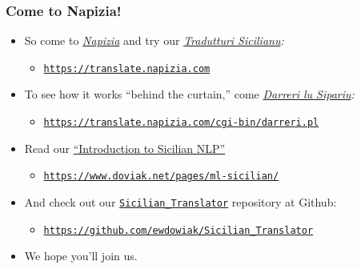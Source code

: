 \documentclass{beamer}
\begin{document}

\begin{frame}
  \frametitle{Come to Napizia!}
  \vspace{-1.0em}
  \begin{itemize}
  \item So come to \href{https://www.napizia.com/index.shtml}{\textit{Napizia}} and try our
    \href{https://translate.napizia.com}{\textit{Tradutturi Sicilianu}}\textit{:}
    \begin{itemize}
    \item \footnotesize{\href{https://translate.napizia.com}{\texttt{https://translate.napizia.com}}}
    \end{itemize}
    \vspace{0.65em}
  \item To see how it works ``behind the curtain,'' come
    \href{https://translate.napizia.com/cgi-bin/darreri.pl}{\textit{Darreri lu Sipariu}}\textit{:}
    \begin{itemize}
    \item \footnotesize{\href{https://translate.napizia.com/cgi-bin/darreri.pl}{\texttt{https://translate.napizia.com/cgi-bin/darreri.pl}}}
    \end{itemize}
    \vspace{0.65em}
  \item Read our \href{https://www.doviak.net/pages/ml-sicilian/}{``Introduction to Sicilian NLP''}
    \begin{itemize}
    \item \footnotesize{\href{https://www.doviak.net/pages/ml-sicilian/}{\texttt{https://www.doviak.net/pages/ml-sicilian/}}}
    \end{itemize}
    \vspace{0.65em}
  \item And check out our \href{https://github.com/ewdowiak/Sicilian_Translator}{\texttt{Sicilian\_Translator}} repository at Github:
    \begin{itemize}
    \item \footnotesize{\href{https://github.com/ewdowiak/Sicilian_Translator}{\texttt{https://github.com/ewdowiak/Sicilian\_Translator}}}
    \end{itemize}
    \vspace{0.65em}
  \item We hope you'll join us. %
  \end{itemize}
\end{frame}
\end{document}
